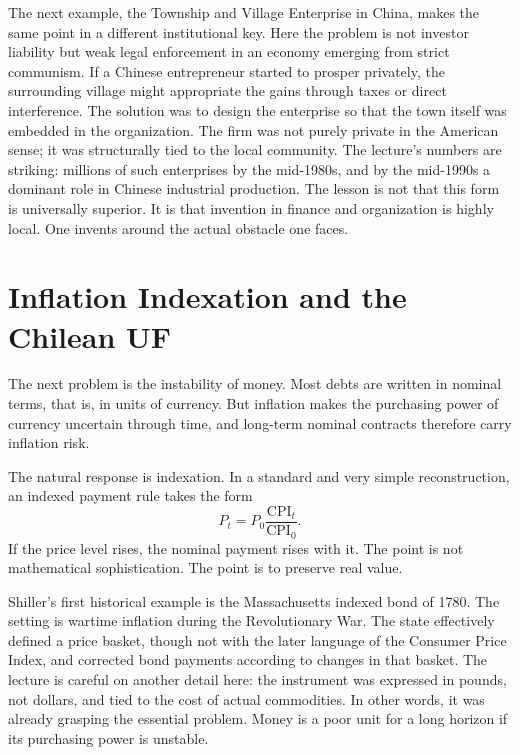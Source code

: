 The next example, the Township and Village Enterprise in China, makes the same point in a different institutional key. Here the problem is not investor liability but weak legal enforcement in an economy emerging from strict communism. If a Chinese entrepreneur started to prosper privately, the surrounding village might appropriate the gains through taxes or direct interference. The solution was to design the enterprise so that the town itself was embedded in the organization. The firm was not purely private in the American sense; it was structurally tied to the local community. The lecture's numbers are striking: millions of such enterprises by the mid-1980s, and by the mid-1990s a dominant role in Chinese industrial production. The lesson is not that this form is universally superior. It is that invention in finance and organization is highly local. One invents around the actual obstacle one faces.

\section{Inflation Indexation and the Chilean UF}

The next problem is the instability of money. Most debts are written in nominal terms, that is, in units of currency. But inflation makes the purchasing power of currency uncertain through time, and long-term nominal contracts therefore carry inflation risk.

The natural response is indexation. In a standard and very simple reconstruction, an indexed payment rule takes the form
\begin{equation}
P_t=P_0\frac{\mathrm{CPI}_t}{\mathrm{CPI}_0}.
\end{equation}
If the price level rises, the nominal payment rises with it. The point is not mathematical sophistication. The point is to preserve real value.

Shiller's first historical example is the Massachusetts indexed bond of 1780. The setting is wartime inflation during the Revolutionary War. The state effectively defined a price basket, though not with the later language of the Consumer Price Index, and corrected bond payments according to changes in that basket. The lecture is careful on another detail here: the instrument was expressed in pounds, not dollars, and tied to the cost of actual commodities. In other words, it was already grasping the essential problem. Money is a poor unit for a long horizon if its purchasing power is unstable.

